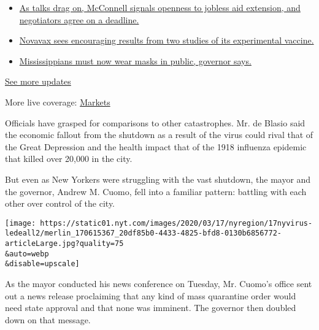 \begin{itemize}
\tightlist
\item
  \href{https://www.nytimes.com/2020/08/04/world/coronavirus-cases.html?action=click\&pgtype=Article\&state=default\&region=MAIN_CONTENT_1\&context=storylines_live_updates\#link-762df92}{As
  talks drag on, McConnell signals openness to jobless aid extension,
  and negotiators agree on a deadline.}
\item
  \href{https://www.nytimes.com/2020/08/04/world/coronavirus-cases.html?action=click\&pgtype=Article\&state=default\&region=MAIN_CONTENT_1\&context=storylines_live_updates\#link-1228a480}{Novavax
  sees encouraging results from two studies of its experimental
  vaccine.}
\item
  \href{https://www.nytimes.com/2020/08/04/world/coronavirus-cases.html?action=click\&pgtype=Article\&state=default\&region=MAIN_CONTENT_1\&context=storylines_live_updates\#link-794484ed}{Mississippians
  must now wear masks in public, governor says.}
\end{itemize}

\href{https://www.nytimes.com/2020/08/04/world/coronavirus-cases.html?action=click\&pgtype=Article\&state=default\&region=MAIN_CONTENT_1\&context=storylines_live_updates}{See
more updates}

More live coverage:
\href{https://www.nytimes.com/live/2020/08/04/business/stock-market-today-coronavirus?action=click\&pgtype=Article\&state=default\&region=MAIN_CONTENT_1\&context=storylines_live_updates}{Markets}

Officials have grasped for comparisons to other catastrophes. Mr. de
Blasio said the economic fallout from the shutdown as a result of the
virus could rival that of the Great Depression and the health impact
that of the 1918 influenza epidemic that killed over 20,000 in the city.

But even as New Yorkers were struggling with the vast shutdown, the
mayor and the governor, Andrew M. Cuomo, fell into a familiar pattern:
battling with each other over control of the city.

\texttt{[image: https://static01.nyt.com/images/2020/03/17/nyregion/17nyvirus-ledeall2/merlin\_170615367\_20df85b0-4433-4825-bfd8-0130b6856772-articleLarge.jpg?quality=75\\\&auto=webp\\\&disable=upscale]}

As the mayor conducted his news conference on Tuesday, Mr. Cuomo's
office sent out a news release proclaiming that any kind of mass
quarantine order would need state approval and that none was imminent.
The governor then doubled down on that message.

